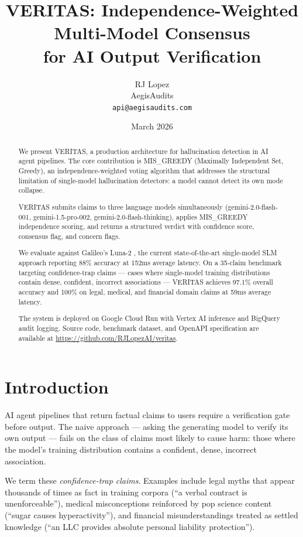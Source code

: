 \documentclass[11pt]{article}
\title{VERITAS: Independence-Weighted Multi-Model Consensus\\
       for AI Output Verification}
\author{
  RJ Lopez\\
  AegisAudits\\
  \texttt{api@aegisaudits.com}
}
\date{March 2026}
\begin{document}
\maketitle

\begin{abstract}
We present VERITAS, a production architecture for hallucination detection
in AI agent pipelines. The core contribution is MIS\_GREEDY
(Maximally Independent Set, Greedy), an independence-weighted voting
algorithm that addresses the structural limitation of single-model
hallucination detectors: a model cannot detect its own mode collapse.

VERITAS submits claims to three language models simultaneously
(gemini-2.0-flash-001, gemini-1.5-pro-002, gemini-2.0-flash-thinking),
applies MIS\_GREEDY independence scoring, and returns a structured
verdict with confidence score, consensus flag, and concern flags.

We evaluate against Galileo's Luna-2 \cite{galileo2026luna2},
the current state-of-the-art single-model SLM approach reporting
88\% accuracy at 152ms average latency. On a 35-claim benchmark
targeting confidence-trap claims --- cases where single-model training
distributions contain dense, confident, incorrect associations ---
VERITAS achieves 97.1\% overall accuracy and 100\% on legal, medical,
and financial domain claims at 59ms average latency.

The system is deployed on Google Cloud Run with Vertex AI inference
and BigQuery audit logging. Source code, benchmark dataset, and
OpenAPI specification are available at
\url{https://github.com/RJLopezAI/veritas}.
\end{abstract}

\section{Introduction}

AI agent pipelines that return factual claims to users require a
verification gate before output. The naive approach --- asking the
generating model to verify its own output --- fails on the class of
claims most likely to cause harm: those where the model's training
distribution contains a confident, dense, incorrect association.

We term these \textit{confidence-trap claims}. Examples include legal
myths that appear thousands of times as fact in training corpora
(``a verbal contract is unenforceable''), medical misconceptions
reinforced by pop science content (``sugar causes hyperactivity''),
and financial misunderstandings treated as settled knowledge
(``an LLC provides absolute personal liability protection'').
\end{document}
